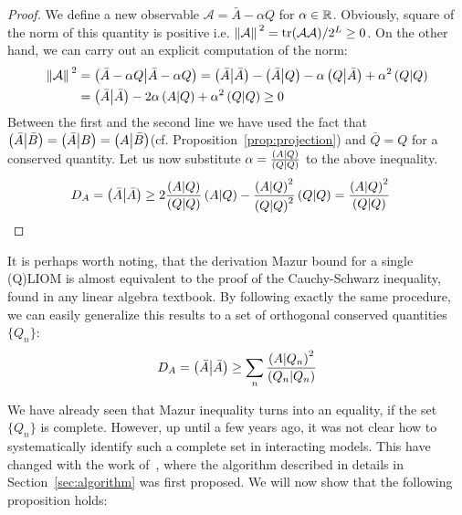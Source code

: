 \begin{proof}
  We define a new observable \(\mathcal{A} = \bar{A} - \alpha Q\) for \(\alpha \in \mathbb{R}\).
  Obviously, square of the norm of this quantity is positive i.e. \(\norm*{\mathcal{A}}^2 = 
  \tr(\mathcal{A}\mathcal{A})/2^L \geq 0\). On the other hand, we can carry out an
  explicit computation of the norm:
  \begin{align*}
  \norm*{\mathcal{A}}^2 &= \left(\bar{A}-\alpha Q \middle| \bar{A}-\alpha Q\right) = \left(\bar{A} \middle| \bar{A}\right) - 
  \left(\bar{A} \middle| Q\right) - \alpha \left(Q \middle| \bar{A}\right) + \alpha^2 \left(Q \middle| Q\right) \\
  &= \left(\bar{A} \middle| \bar{A}\right) - 2\alpha \left(A \middle| Q\right) + \alpha^2 \left(Q \middle| Q\right) \geq 0
  \end{align*}
  Between the first and the second line we have used the fact that \(\left(\bar{A} \middle| \bar{B}\right) = 
  \left(\bar{A} \middle| B\right) = \left(A \middle| \bar{B}\right)\)(cf. Proposition~\ref{prop:projection}) and \(\bar{Q} = Q\) 
  for a conserved quantity. Let us now substitute \(\alpha = \frac{\left(A \middle| Q\right)}{\left(Q \middle| Q\right)}\) to the
  above inequality.
  \begin{align*}
    D_A = \left(\bar{A} \middle| \bar{A}\right) &\geq 2 \frac{\left(A \middle| Q\right)}{\left(Q \middle| Q\right)} \left(A \middle| Q\right) - \frac{\left(A \middle| Q\right)^2}{\left(Q \middle| Q\right)^2}\left(Q \middle| Q\right)
    = \frac{\left(A \middle| Q\right)^2}{\left(Q \middle| Q\right)}
  \end{align*}
  \label{proof:single mazur}  
\end{proof}
It is perhaps worth noting, that the derivation Mazur bound for a single (Q)LIOM is almost equivalent to the proof of
the Cauchy-Schwarz inequality, found in any linear algebra textbook. By following exactly the same procedure, 
we can easily generalize this results to a set of orthogonal conserved quantities \(\{Q_{n}\}\):
\begin{equation}
  D_A = \left(\bar{A} \middle| \bar{A}\right) \geq \sum_{n} \frac{\left(A \middle| Q_n\right)^2}{\left(Q_n \middle| Q_n\right)}
\end{equation}

We have already seen that Mazur inequality turns into an equality, if the set \(\{Q_n\}\) is complete. However,
up until a few years ago, it was not clear how to systematically identify such a complete set in interacting models.
This have changed with the work of~\textcite{Mierzejewski2015a}, where the algorithm described in details
in Section~\ref{sec:algorithm} was first proposed. We will now show that the following proposition holds:

